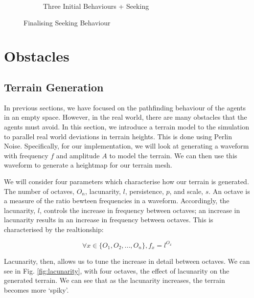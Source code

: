 \documentclass{article}
\begin{document}
\begin{figure}[H]
\begin{subfigure}{.45\textwidth}
\caption{Three Initial Behaviours + Seeking}
\label{fig:exp7}
\end{subfigure}
\caption{Finalising Seeking Behaviour}
\label{fig:exp67}
\end{figure}

\section{Obstacles}
\subsection{Terrain Generation}
In previous sections, we have focused on the pathfinding behaviour of the agents in an empty space. However, in the real world, there are many obstacles that the agents must avoid. In this section, we introduce a terrain model to the simulation to parallel real world deviations in terrain heights. This is done using Perlin Noise\cite[289-293]{Perlin}. Specifically, for our implementation, we will look at generating a waveform with frequency $f$ and amplitude $A$ to model the terrain. We can then use this waveform to generate a heightmap for our terrain mesh.

We will consider four parameters which characterise how our terrain is generated. The number of octaves, $O_n$, lacunarity, $l$, persistence, $p$, and scale, $s$.
An octave is a measure of the ratio bewteen frequencies in a waveform. Accordingly, the lacunarity, $l$, controls the increase in frequency between octaves; an increase in lacunarity results in an increase in frequency between octaves. This is characterised by the realtionship:

$$\forall x \in \{O_1,O_2,...,O_n\}, f_x = l^{O_x}$$

Lacunarity, then, allows us to tune the increase in detail between octaves. We can see in Fig. \ref{fig:lacunarity}, with four octaves, the effect of lacunarity on the generated terrain. We can see that as the lacunarity increases, the terrain becomes more `spiky'.
\end{document}
